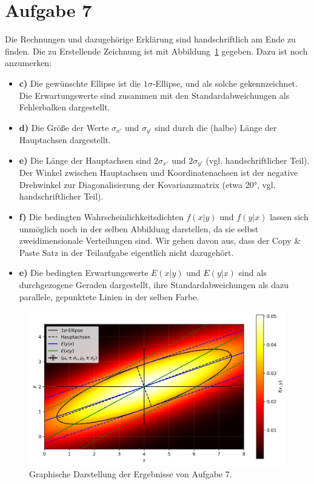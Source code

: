 \documentclass[a4paper, 11pt]{article}
\begin{document}
\section*{Aufgabe 7}
Die Rechnungen und dazugehörige Erklärung sind handschriftlich am Ende zu finden. Die zu Erstellende \glqq Zeichnung\grqq{} ist mit Abbildung~\ref{fig:A7} gegeben. Dazu ist noch anzumerken:
\begin{itemize}
    \item \textbf{c)} Die gewünschte Ellipse ist die $1\sigma$-Ellipse, und als solche gekennzeichnet. Die Erwartungswerte sind zusammen mit den Standardabweichungen als Fehlerbalken dargestellt.
    \item \textbf{d)} Die Größe der Werte $\sigma_{x'}$ und $\sigma_{y'}$ sind durch die (halbe) Länge der Hauptachsen dargestellt.
    \item \textbf{e)} Die Länge der Hauptachsen sind $2\sigma_{x'}$ und $2\sigma_{y'}$ (vgl. handschriftlicher Teil). Der Winkel zwischen Hauptachsen und Koordinatenachsen ist der negative Drehwinkel zur Diagonalisierung der Kovarianzmatrix (etwa 20°, vgl. handschriftlicher Teil).
    \item \textbf{f)} Die bedingten Wahrscheinlichkeitsdichten $f(x|y)$ und $f(y|x)$ lassen sich unmöglich noch in der selben Abbildung darstellen, da sie selbst zweidimensionale Verteilungen sind. Wir gehen davon aus, dass der Copy \& Paste Satz in der Teilaufgabe eigentlich nicht dazugehört.
    \item \textbf{e)} Die bedingten Erwartungswerte $E(x|y)$ und $E(y|x)$ sind als durchgezogene Geraden dargestellt, ihre Standardabweichungen als dazu parallele, gepunktete Linien in der selben Farbe.
\end{itemize}
\begin{figure}[H]
    \centering
    \includegraphics[width=\textwidth]{../A07/A7.png}
    \caption{Graphische Darstellung der Ergebnisse von Aufgabe 7.}
    \label{fig:A7}
\end{figure}

\end{document}

